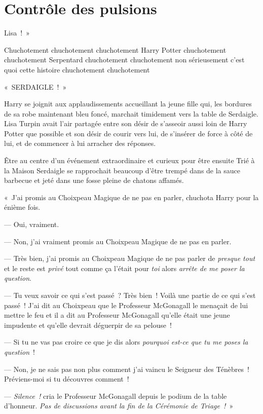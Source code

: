 \chapter{Contrôle des pulsions}

 Lisa~!~»

\hplettrineextrapara
Chuchotement chuchotement chuchotement Harry Potter chuchotement chuchotement Serpentard chuchotement chuchotement non sérieusement c'est quoi cette histoire chuchotement chuchotement

«~SERDAIGLE~!~»

Harry se joignit aux applaudissements accueillant la jeune fille qui, les bordures de sa robe maintenant bleu foncé, marchait timidement vers la table de Serdaigle. Lisa Turpin avait l'air partagée entre son désir de s'asseoir aussi loin de Harry Potter que possible et son désir de courir vers lui, de s'insérer de force à côté de lui, et de commencer à lui arracher des réponses.

Être au centre d'un événement extraordinaire et curieux pour être ensuite Trié à la Maison Serdaigle se rapprochait beaucoup d'être trempé dans de la sauce barbecue et jeté dans une fosse pleine de chatons affamés.

«~J'ai promis au Choixpeau Magique de ne pas en parler, chuchota Harry pour la énième fois.

--- Oui, vraiment.

--- Non, j'ai vraiment promis au Choixpeau Magique de ne pas en parler.

--- Très bien, j'ai promis au Choixpeau Magique de ne pas parler de \emph{presque tout} et le reste est \emph{privé} tout comme ça l'était pour \emph{toi} alors \emph{arrête de me poser la question}.

--- Tu veux savoir ce qui s'est passé~? Très bien~! Voilà une partie de ce qui s'est passé~! J'ai dit au Choixpeau que le Professeur McGonagall le menaçait de lui mettre le feu et il a dit au Professeur McGonagall qu'elle était une jeune impudente et qu'elle devrait déguerpir de sa pelouse~!

--- Si tu ne vas pas croire ce que je dis alors \emph{pourquoi est-ce que tu me poses la question}~!

--- Non, je ne sais pas non plus comment j'ai vaincu le Seigneur des Ténèbres~! Préviens-moi si tu découvres comment~!

--- \emph{Silence~!} cria le Professeur McGonagall depuis le podium de la table d'honneur. \emph{Pas de discussions avant la fin de la Cérémonie de Triage~!}~»

